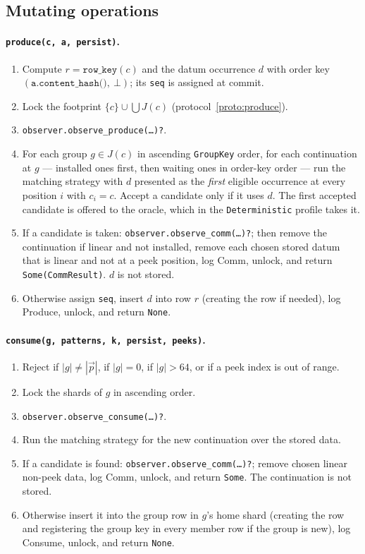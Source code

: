 \documentclass[11pt]{article}
\theoremstyle{plain}
\theoremstyle{definition}
\newcommand{\code}[1]{\texttt{#1}}
\begin{document}
\subsection{Mutating operations}

\paragraph{\code{produce(c, a, persist)}.}
\begin{enumerate}[nosep]
\item Compute $r=\code{row\_key}(c)$ and the datum occurrence $d$ with order key
      $(\code{a.content\_hash()},\ \bot)$; its \code{seq} is assigned at commit.
\item Lock the footprint $\{c\}\cup\bigcup J(c)$ (protocol~\ref{proto:produce}).
\item \code{observer.observe\_produce(\dots)?}.
\item For each group $g\in J(c)$ in ascending \code{GroupKey} order, for each
      continuation at $g$ --- installed ones first, then waiting ones in order-key
      order --- run the matching strategy with $d$ presented as the \emph{first}
      eligible occurrence at every position $i$ with $c_i=c$. Accept a candidate only
      if it uses $d$. The first accepted candidate is offered to the oracle, which in
      the \code{Deterministic} profile takes it.
\item If a candidate is taken: \code{observer.observe\_comm(\dots)?}; then remove the
      continuation if linear and not installed, remove each chosen stored datum that
      is linear and not at a peek position, log \textsf{Comm}, unlock, and return
      \code{Some(CommResult)}. $d$ is not stored.
\item Otherwise assign \code{seq}, insert $d$ into row $r$ (creating the row if
      needed), log \textsf{Produce}, unlock, and return \code{None}.
\end{enumerate}

\paragraph{\code{consume(g, patterns, k, persist, peeks)}.}
\begin{enumerate}[nosep]
\item Reject if $|g|\neq|\vec p|$, if $|g|=0$, if $|g|>64$, or if a peek index is out
      of range.
\item Lock the shards of $g$ in ascending order.
\item \code{observer.observe\_consume(\dots)?}.
\item Run the matching strategy for the new continuation over the stored data.
\item If a candidate is found: \code{observer.observe\_comm(\dots)?}; remove chosen
      linear non-peek data, log \textsf{Comm}, unlock, and return \code{Some}. The
      continuation is not stored.
\item Otherwise insert it into the group row in $g$'s home shard (creating the
      row and registering the group key in every member row if the group is new),
      log \textsf{Consume}, unlock, and return \code{None}.
\end{enumerate}
\end{document}
